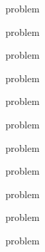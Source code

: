 \documentclass[11pt,a4paper,oneside,final]{article}
\begin{document}
{problem}

{problem}

{problem}

{problem}

{problem}

{problem}

{problem}

{problem}

{problem}

{problem}

{problem}
\end{document}
